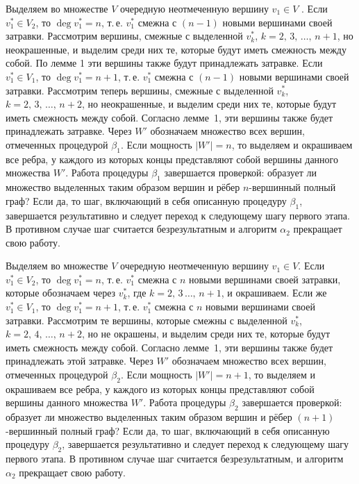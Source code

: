  Выделяем во множестве $V$ очередную
неотмеченную вершину $v_1 \in V$ \cite{utakaeva:bib2}. Если $v_1^\ast \in V_2$, то $\deg v_1^\ast =n$, т.\,е. $v_1^\ast$ смежна с
$(n-1)$ новыми вершинами своей затравки. Рассмотрим вершины, смежные с выделенной $v_k^\ast$, $k=2,\,3,\,\ldots,\,n+1$, но
неокрашенные, и выделим среди них те, которые будут иметь смежность между собой. По лемме 1 эти вершины также будут принадлежать
затравке. Если $v_1^\ast \in V_1$, то $\deg v_1^\ast =n+1$, т.\,е. $v_1^\ast$ смежна с $( n-1)$ новыми вершинами своей
затравки. Рассмотрим теперь вершины, смежные с выделенной $v_k^\ast$, $k=2,\,3,\,\ldots,\,n+2$, но неокрашенные, и выделим среди
них те, которые будут иметь смежность между собой. Согласно лемме~1, эти вершины также будет принадлежать затравке. Через $W'$
обозначаем множество всех вершин, отмеченных процедурой $\beta_1$. Если мощность $|W'|=n$, то выделяем и окрашиваем все ребра, у
каждого из которых концы представляют собой вершины данного множества $W'$. Работа процедуры $\beta_1$ завершается проверкой:
образует ли множество выделенных таким образом вершин и рёбер $n$-вершинный полный граф? Если да, то шаг, включающий в себя
описанную процедуру $\beta_1$, завершается результативно и следует переход к следующему шагу первого этапа. В противном случае
шаг считается безрезультатным и алгоритм $\alpha_2$ прекращает свою работу.

\smallskip

 Выделяем во множестве $V$ очередную
неотмеченную вершину $v_1 \in V$. Если $v_1^\ast \in V_2$, то $\deg v_1^\ast =n$, т.\,е. $v_1^\ast $ смежна с $n$
новыми вершинами своей затравки, которые обозначаем через $v_k^\ast$, где $k=2,\,3\, \ldots,\,n+1$, и окрашиваем. Если же
$v_1^\ast \in V_1$, то $\deg v_1^\ast =n+1$, т.\,е. $v_1^\ast$ смежна с $n$ новыми вершинами своей затравки. Рассмотрим те
вершины, которые смежны с выделенной $v_k^\ast$, $k=2,\,4,\,\ldots,\,n+2$, но не окрашены, и выделим среди них те, которые будут
иметь смежность между собой. Согласно лемме~1, эти вершины также будет принадлежать этой затравке. Через $W'$ обозначаем
множество всех вершин, отмеченных процедурой $\beta_2$. Если мощность $| W'|=n+1$, то выделяем и окрашиваем все ребра, у каждого
из которых концы представляют собой вершины данного множества $W'$. Работа процедуры $\beta_2$ завершается проверкой: образует ли
множество выделенных таким образом вершин и рёбер $(n+1)$-вершинный полный граф? Если да, то шаг, включающий в себя описанную
процедуру $\beta_2$, завершается результативно и следует переход к следующему шагу первого этапа. В противном случае шаг
считается безрезультатным, и алгоритм $\alpha_2$ прекращает свою работу.

